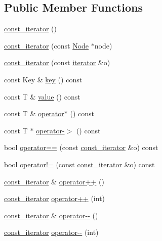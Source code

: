 \subsection*{Public Member Functions}
\begin{DoxyCompactItemize}
\item 
\hyperlink{class_q_map_1_1const__iterator_a20c713db84fe7c6fdb46128ce9251e6d}{const\+\_\+iterator} ()
\item 
\hyperlink{class_q_map_1_1const__iterator_a6197d2c8ac8a9ff50f25216dfd27ae45}{const\+\_\+iterator} (const \hyperlink{struct_q_map_node}{Node} $\ast$node)
\item 
\hyperlink{class_q_map_1_1const__iterator_a4209d7f111c942fc466bf14ff2ef9884}{const\+\_\+iterator} (const \hyperlink{class_q_map_1_1iterator}{iterator} \&o)
\item 
const Key \& \hyperlink{class_q_map_1_1const__iterator_a130e2c00e2ab88936f643ec613e19b51}{key} () const 
\item 
const T \& \hyperlink{class_q_map_1_1const__iterator_ac072e46fb5edc7c52a1548501af5edb4}{value} () const 
\item 
const T \& \hyperlink{class_q_map_1_1const__iterator_ae076d536c6747db859fee27cdb5f8f02}{operator$\ast$} () const 
\item 
const T $\ast$ \hyperlink{class_q_map_1_1const__iterator_aaf20dee44ae98700fd2de76fbe42c802}{operator-\/$>$} () const 
\item 
bool \hyperlink{class_q_map_1_1const__iterator_a8db4bcddcb6bb671a8964d8154194a63}{operator==} (const \hyperlink{class_q_map_1_1const__iterator}{const\+\_\+iterator} \&o) const 
\item 
bool \hyperlink{class_q_map_1_1const__iterator_a6de4ddce6aa804d205b986494cc5ee14}{operator!=} (const \hyperlink{class_q_map_1_1const__iterator}{const\+\_\+iterator} \&o) const 
\item 
\hyperlink{class_q_map_1_1const__iterator}{const\+\_\+iterator} \& \hyperlink{class_q_map_1_1const__iterator_ab73d648db562e7a341e344e8f19bdddb}{operator++} ()
\item 
\hyperlink{class_q_map_1_1const__iterator}{const\+\_\+iterator} \hyperlink{class_q_map_1_1const__iterator_afffc14c2edc5f4abb9292679af499bb5}{operator++} (int)
\item 
\hyperlink{class_q_map_1_1const__iterator}{const\+\_\+iterator} \& \hyperlink{class_q_map_1_1const__iterator_ad77aa4e0649816340d44c161f02d4e3d}{operator-\/-\/} ()
\item 
\hyperlink{class_q_map_1_1const__iterator}{const\+\_\+iterator} \hyperlink{class_q_map_1_1const__iterator_a5fe1c4de55e8c86b245c7775b743e7bb}{operator-\/-\/} (int)

\end{DoxyCompactItemize}
